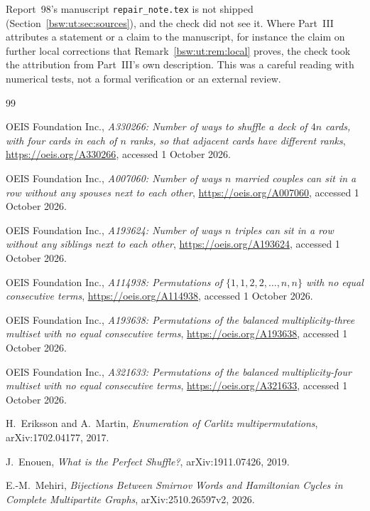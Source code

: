 \documentclass[11pt,letterpaper]{article}
\theoremstyle{definition}
\theoremstyle{remark}
\begin{document}
Report~98's manuscript \texttt{repair\_note.tex} is not shipped
(Section~\ref{bsw:ut:sec:sources}), and the check did not see it.  Where
Part~III attributes a statement or a claim to the manuscript, for instance
the claim on further local corrections that
Remark~\ref{bsw:ut:rem:local} proves, the check took the attribution from
Part~III's own description.  This was a careful reading with numerical
tests, not a formal verification or an external review.


\begin{thebibliography}{99}

OEIS Foundation Inc.,
\emph{A330266: Number of ways to shuffle a deck of $4n$ cards, with four
cards in each of $n$ ranks, so that adjacent cards have different ranks},
\url{https://oeis.org/A330266}, accessed 1 October 2026.

OEIS Foundation Inc.,
\emph{A007060: Number of ways $n$ married couples can sit in a row without
any spouses next to each other},
\url{https://oeis.org/A007060}, accessed 1 October 2026.

OEIS Foundation Inc.,
\emph{A193624: Number of ways $n$ triples can sit in a row without any
siblings next to each other},
\url{https://oeis.org/A193624}, accessed 1 October 2026.

OEIS Foundation Inc.,
\emph{A114938: Permutations of $\{1,1,2,2,\ldots,n,n\}$ with no equal
consecutive terms},
\url{https://oeis.org/A114938}, accessed 1 October 2026.

OEIS Foundation Inc.,
\emph{A193638: Permutations of the balanced multiplicity-three multiset with
no equal consecutive terms},
\url{https://oeis.org/A193638}, accessed 1 October 2026.

OEIS Foundation Inc.,
\emph{A321633: Permutations of the balanced multiplicity-four multiset with
no equal consecutive terms},
\url{https://oeis.org/A321633}, accessed 1 October 2026.

H.~Eriksson and A.~Martin,
\emph{Enumeration of Carlitz multipermutations},
arXiv:1702.04177, 2017.

J.~Enouen,
\emph{What is the Perfect Shuffle?},
arXiv:1911.07426, 2019.

E.-M.~Mehiri,
\emph{Bijections Between Smirnov Words and Hamiltonian Cycles in Complete
Multipartite Graphs}, arXiv:2510.26597v2, 2026.


\end{thebibliography}
\end{document}
